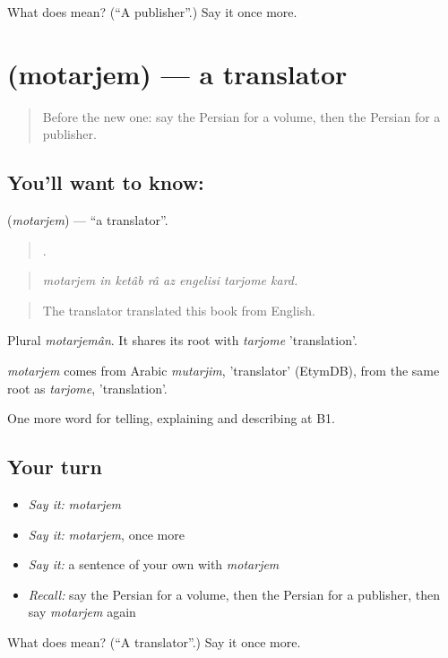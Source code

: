 \begin{tcolorbox}[breakable,colback=teal!4,colframe=teal!35!black,title={Before you move on}]
What does  mean? (\textquotedblleft{}A publisher\textquotedblright{}.) Say it once more.
\end{tcolorbox}
\section[\texorpdfstring{\fa{مترجم} (motarjem)}{مترجم (motarjem)}]{ (motarjem) — a translator}

\label{lesson:FA-C528-motarjem}



\begin{quote}
Before the new one: say the Persian for a volume, then the Persian for a publisher.
\end{quote}

\subsection*{You'll want to know: }
\textbf{} (\emph{motarjem}) — \textquotedblleft{}a translator\textquotedblright{}.

\begin{quote}
       .
\end{quote}

\begin{quote}
\emph{motarjem in ketâb râ az engelisi tarjome kard.}
\end{quote}

\begin{quote}
The translator translated this book from English.
\end{quote}

Plural \emph{motarjemân}. It shares its root with \emph{tarjome} 'translation'.

\begin{cousinweb}
\emph{motarjem} comes from Arabic \emph{mutarjim}, 'translator' (EtymDB), from the same root as \emph{tarjome}, 'translation'.
\end{cousinweb}

\begin{grammarlens}[title={What you've built}]
One more word for telling, explaining and describing at B1.
\end{grammarlens}

\subsection*{Your turn}
\begin{itemize}
\raggedright
  \item \emph{Say it:} \emph{motarjem}
  \item \emph{Say it:} \emph{motarjem}, once more
  \item \emph{Say it:} a sentence of your own with \emph{motarjem}
  \item \emph{Recall:} say the Persian for a volume, then the Persian for a publisher, then say \emph{motarjem} again
\end{itemize}

\begin{tcolorbox}[breakable,colback=teal!4,colframe=teal!35!black,title={Before you move on}]
What does  mean? (\textquotedblleft{}A translator\textquotedblright{}.) Say it once more.
\end{tcolorbox}
